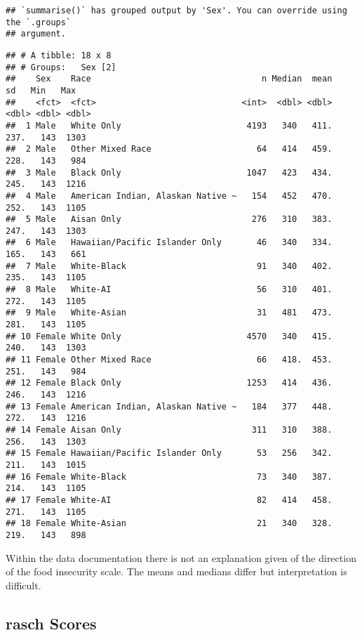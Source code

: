 \documentclass[
]{article}
\begin{document}
\begin{verbatim}
## `summarise()` has grouped output by 'Sex'. You can override using the `.groups`
## argument.
\end{verbatim}

\begin{verbatim}
## # A tibble: 18 x 8
## # Groups:   Sex [2]
##    Sex    Race                                  n Median  mean    sd   Min   Max
##    <fct>  <fct>                             <int>  <dbl> <dbl> <dbl> <dbl> <dbl>
##  1 Male   White Only                         4193   340   411.  237.   143  1303
##  2 Male   Other Mixed Race                     64   414   459.  228.   143   984
##  3 Male   Black Only                         1047   423   434.  245.   143  1216
##  4 Male   American Indian, Alaskan Native ~   154   452   470.  252.   143  1105
##  5 Male   Aisan Only                          276   310   383.  247.   143  1303
##  6 Male   Hawaiian/Pacific Islander Only       46   340   334.  165.   143   661
##  7 Male   White-Black                          91   340   402.  235.   143  1105
##  8 Male   White-AI                             56   310   401.  272.   143  1105
##  9 Male   White-Asian                          31   481   473.  281.   143  1105
## 10 Female White Only                         4570   340   415.  240.   143  1303
## 11 Female Other Mixed Race                     66   418.  453.  251.   143   984
## 12 Female Black Only                         1253   414   436.  246.   143  1216
## 13 Female American Indian, Alaskan Native ~   184   377   448.  272.   143  1216
## 14 Female Aisan Only                          311   310   388.  256.   143  1303
## 15 Female Hawaiian/Pacific Islander Only       53   256   342.  211.   143  1015
## 16 Female White-Black                          73   340   387.  214.   143  1105
## 17 Female White-AI                             82   414   458.  271.   143  1105
## 18 Female White-Asian                          21   340   328.  219.   143   898
\end{verbatim}

Within the data documentation there is not an explanation given of the
direction of the food insecurity scale. The means and medians differ but
interpretation is difficult.

\hypertarget{rasch-scores}{%
\subsection{rasch Scores}\label{rasch-scores}}
\end{document}
